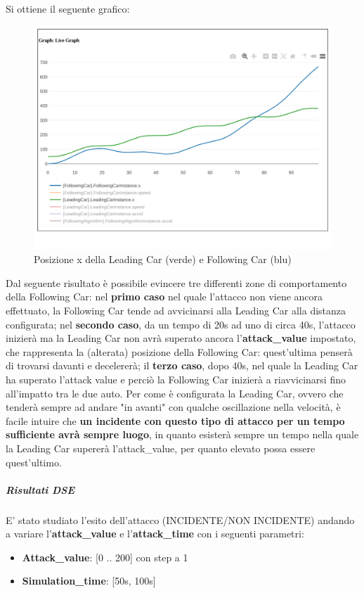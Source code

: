 Si ottiene il seguente grafico:
\begin{figure}[H]
	\centering
	\includegraphics[width=\textwidth]{img/AttackXSimulation.png}
	\caption{Posizione x della Leading Car (verde) e Following Car (blu)}
\end{figure}
Dal seguente risultato è possibile evincere tre differenti zone di comportamento della Following Car: nel \textbf{primo caso} nel quale l'attacco non viene ancora effettuato, la Following Car tende ad avvicinarsi alla Leading Car alla distanza configurata; nel \textbf{secondo caso}, da un tempo di 20s ad uno di circa 40s, l'attacco inizierà ma la Leading Car non avrà superato ancora l'\textbf{attack\_value} impostato, che rappresenta la (alterata) posizione della Following Car: quest'ultima penserà di trovarsi davanti e decelererà; il \textbf{terzo caso}, dopo 40s, nel quale la Leading Car ha superato l'attack value e perciò la Following Car inizierà a riavvicinarsi fino all'impatto tra le due auto.
Per come è configurata la Leading Car, ovvero che tenderà sempre ad andare "in avanti" con qualche oscillazione nella velocità, è facile intuire che \textbf{un incidente con questo tipo di attacco per un tempo sufficiente avrà sempre luogo}, in quanto esisterà sempre un tempo nella quale la Leading Car supererà l'attack\_value, per quanto elevato possa essere quest'ultimo.  
\subparagraph{Risultati DSE}
E' stato studiato l'esito dell'attacco (INCIDENTE/NON INCIDENTE) andando a variare l'\textbf{attack\_value} e l'\textbf{attack\_time} con i seguenti parametri:
\begin{itemize}
	\item \textbf{Attack\_value}: [0 .. 200] con step a 1
	\item \textbf{Simulation\_time}: [50s, 100s]
\end{itemize}
 
